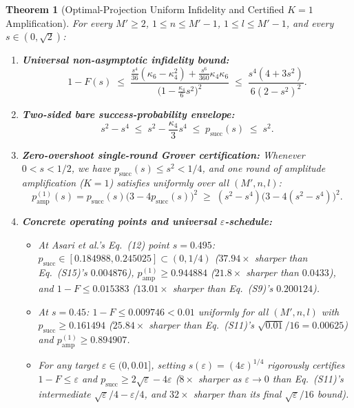 \documentclass[11pt,a4paper]{article}
\newtheorem{theorem}{Theorem}
\theoremstyle{remark}
\begin{document}
\begin{theorem}[Optimal-Projection Uniform Infidelity and Certified $K = 1$ Amplification]
\label{thm:B}
For every $M' \ge 2$, $1 \le n \le M'-1$, $1 \le l \le M'-1$, and every $s \in (0, \sqrt{2})$:
\begin{enumerate}
\item[\textnormal{(i)}] \textbf{Universal non-asymptotic infidelity bound:}
\begin{equation}
\label{eq:infid_sharp}
1 - F(s) \;\le\; \frac{\frac{s^4}{36}(\kappa_6 - \kappa_4^2) + \frac{s^6}{360}\kappa_4\kappa_6}{\bigl(1 - \frac{\kappa_4}{6} s^2\bigr)^2}
\;\le\; \frac{s^4(4 + 3s^2)}{6(2 - s^2)^2}.
\end{equation}
\item[\textnormal{(ii)}] \textbf{Two-sided bare success-probability envelope:}
\begin{equation}
\label{eq:psucc_env}
s^2 - s^4 \;\le\; s^2 - \frac{\kappa_4}{3} s^4 \;\le\; p_{\mathrm{succ}}(s) \;\le\; s^2.
\end{equation}
\item[\textnormal{(iii)}] \textbf{Zero-overshoot single-round Grover certification:} Whenever $0 < s < 1/2$, we have $p_{\mathrm{succ}}(s) \le s^2 < 1/4$, and one round of amplitude amplification ($K = 1$) satisfies uniformly over all $(M', n, l)$:
\begin{equation}
\label{eq:grover_k1}
p_{\mathrm{amp}}^{(1)}(s) = p_{\mathrm{succ}}(s)\bigl(3 - 4 p_{\mathrm{succ}}(s)\bigr)^2 \;\ge\; (s^2 - s^4)\bigl(3 - 4(s^2 - s^4)\bigr)^2.
\end{equation}
\item[\textnormal{(iv)}] \textbf{Concrete operating points and universal $\varepsilon$-schedule:}
\begin{itemize}
\item At Asari et al.'s Eq.~(12) point $s = 0.495$: $p_{\mathrm{succ}} \in [0.184988, 0.245025] \subset (0, 1/4)$ ($37.94\times$ sharper than Eq.~(S15)'s $0.004876$), $p_{\mathrm{amp}}^{(1)} \ge 0.944884$ ($21.8\times$ sharper than $0.0433$), and $1 - F \le 0.015383$ ($13.01\times$ sharper than Eq.~(S9)'s $0.200124$).
\item At $s = 0.45$: $1 - F \le 0.009746 < 0.01$ uniformly for all $(M', n, l)$ with $p_{\mathrm{succ}} \ge 0.161494$ ($25.84\times$ sharper than Eq.~(S11)'s $\sqrt{0.01}/16 = 0.00625$) and $p_{\mathrm{amp}}^{(1)} \ge 0.894907$.
\item For any target $\varepsilon \in (0, 0.01]$, setting $s(\varepsilon) = (4\varepsilon)^{1/4}$ rigorously certifies $1 - F \le \varepsilon$ and $p_{\mathrm{succ}} \ge 2\sqrt{\varepsilon} - 4\varepsilon$ ($8\times$ sharper as $\varepsilon \to 0$ than Eq.~(S11)'s intermediate $\sqrt{\varepsilon}/4 - \varepsilon/4$, and $32\times$ sharper than its final $\sqrt{\varepsilon}/16$ bound).
\end{itemize}
\end{enumerate}
\end{theorem}
\end{document}
